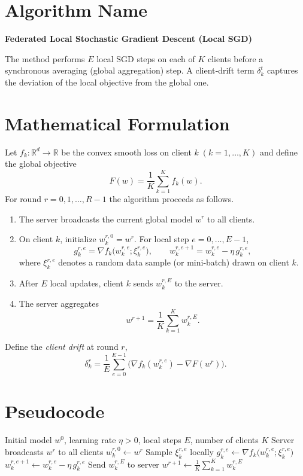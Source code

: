 \documentclass[11pt]{article}
\newcommand{\R}{\mathbb{R}}
\begin{document}
\section*{Algorithm Name}
\textbf{Federated Local Stochastic Gradient Descent (Local SGD)}  

The method performs $E$ local SGD steps on each of $K$ clients before a synchronous averaging (global aggregation) step. A client‐drift term $\delta_{k}^{t}$ captures the deviation of the local objective from the global one.

\section*{Mathematical Formulation}
Let $f_k:\R^{d}\to\R$ be the convex smooth loss on client $k\;(k=1,\dots,K)$ and define the global objective
\[
F(w)=\frac{1}{K}\sum_{k=1}^{K}f_k(w).
\]
For round $r=0,1,\dots,R-1$ the algorithm proceeds as follows.

\begin{enumerate}[label=\arabic*.]
\item The server broadcasts the current global model $w^{r}$ to all clients.
\item On client $k$, initialize $w_{k}^{r,0}=w^{r}$. For local step $e=0,\dots,E-1$,
\[
g_{k}^{r,e}= \nabla f_k\!\bigl(w_{k}^{r,e};\xi_{k}^{r,e}\bigr),\qquad
w_{k}^{r,e+1}= w_{k}^{r,e}-\eta\, g_{k}^{r,e},
\]
where $\xi_{k}^{r,e}$ denotes a random data sample (or mini‑batch) drawn on client $k$.
\item After $E$ local updates, client $k$ sends $w_{k}^{r,E}$ to the server.
\item The server aggregates
\[
w^{r+1}= \frac{1}{K}\sum_{k=1}^{K} w_{k}^{r,E}.
\]
\end{enumerate}
Define the \emph{client drift} at round $r$,
\[
\delta_{k}^{r}= \frac{1}{E}\sum_{e=0}^{E-1}\!\bigl(\nabla f_k(w_{k}^{r,e})-\nabla F(w^{r})\bigr).
\]

\section*{Pseudocode}
\begin{algorithm}[H]
\caption{Local SGD (Federated Averaging)}
\begin{algorithmic}[1]
\Require Initial model $w^{0}$, learning rate $\eta>0$, local steps $E$, number of clients $K$
    \State Server broadcasts $w^{r}$ to all clients
        \State $w_{k}^{r,0}\gets w^{r}$
            \State Sample $\xi_{k}^{r,e}$ locally
            \State $g_{k}^{r,e}\gets \nabla f_k\!\bigl(w_{k}^{r,e};\xi_{k}^{r,e}\bigr)$
            \State $w_{k}^{r,e+1}\gets w_{k}^{r,e}-\eta\, g_{k}^{r,e}$
        \EndFor
        \State Send $w_{k}^{r,E}$ to server
    \EndFor
    \State $w^{r+1}\gets \frac{1}{K}\sum_{k=1}^{K} w_{k}^{r,E}$
\EndFor
\end{algorithmic}
\end{algorithm}
\end{document}
